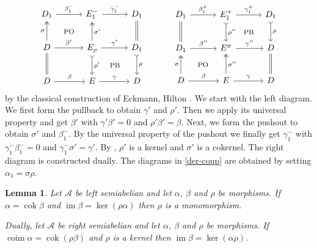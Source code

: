 \documentclass[a4paper,10pt,reqno]{amsart}
\newtheorem{lem}[thm]{Lemma}
\newcommand{\cok}{\operatorname{cok}\nolimits}
\newcommand{\im}{\operatorname{im}\nolimits}
\newcommand{\coim}{\operatorname{coim}\nolimits}
\begin{document}
	\begin{equation}\label{eck-hil2}
		\begin{tikzcd}[column sep=1.1ex, row sep=1.1ex]
			D_1\arrow[]{rr}{\beta_1^-}  && E_1^-\arrow[]{rr}{\gamma_1^-} &&D_1 \arrow[equal]{dd}\\
			&\text{\footnotesize\rm PO}&&\text{\footnotesize\rm\phantom{PB}}&\\
			D\arrow[two heads]{uu}{\sigma}\arrow[]{rr}{\beta'}   && E_{\rho}\arrow[two heads]{uu}[swap]{\sigma'}\arrow[]{rr}{\gamma'}\arrow[tail]{dd}{\rho'} &&D_1 \arrow[tail]{dd}{\rho}\\
			&\text{\footnotesize\rm\phantom{PB}}&&\text{\footnotesize\rm PB}&\\
			D \arrow[equal]{uu} \arrow[]{rr}{\beta} && E \arrow[]{rr}{\gamma}&&  D
		\end{tikzcd}\hspace{30pt}
		\begin{tikzcd}[column sep=1.1ex, row sep=1.1ex]
			D_1\arrow[]{rr}{\beta_1^+} && E_1^+\arrow[]{rr}{\gamma_1^+}\arrow[tail]{dd}{\rho''}&& D_1 \arrow[tail]{dd}{\rho}\\
			&\text{\footnotesize\rm\phantom{PB}}&&\text{\footnotesize\rm PB}&\\
			D_1\arrow[equal]{uu}\arrow[]{rr}{\beta''} && E^{\sigma}\arrow[]{rr}{\gamma''} &&D\arrow[equal]{dd} \\
			&\text{\footnotesize\rm PO}&&\text{\footnotesize\rm\phantom{PB}}&\\
			D \arrow[two heads]{uu}{\sigma} \arrow[]{rr}{\beta} && E \arrow[]{rr}{\gamma}\arrow[two heads]{uu}[swap]{\sigma''}&&  D
		\end{tikzcd}
	\end{equation}
	by the classical construction of Eckmann, Hilton \cite{EH}. We start with the left diagram. We first form the pullback to obtain $\gamma'$ and $\rho'$. Then we apply its universal property and get $\beta'$ with $\gamma'\beta'=0$ and $\rho'\beta'=\beta$. Next, we form the pushout to obtain $\sigma'$ and $\beta_1^-$. By the universal property of the pushout we finally get $\gamma_1^-$ with $\gamma_1^-\beta_1^-=0$ and $\gamma_1^-\sigma'=\gamma'$. By \cite[Lemma~2.1(iii)]{KW}, $\rho'$ is a kernel and $\sigma'$ is a cokernel. The right diagram is constructed dually. The diagrams in \eqref{der-coup} are obtained by setting $\alpha_1=\sigma\rho$.
	
	\smallskip
	
	\begin{lem}\label{second}\cite[Lemmas 3 and 4]{KW2} Let $\mathcal{A}$ be left semiabelian and let $\alpha$, $\beta$ and $\rho$ be morphisms. If $\alpha=\cok\beta$ and $\im\beta=\ker(\rho\alpha)$ then $\rho$ is a monomorphism.
		
		Dually, let $\mathcal{A}$ be right semiabelian and let $\alpha$, $\beta$ and $\rho$ be morphisms. If $\coim\alpha=\cok(\rho\beta)$ and $\rho$ is a kernel then $\im\beta=\ker(\alpha\rho)$.
	\end{lem}
	
\end{document}
